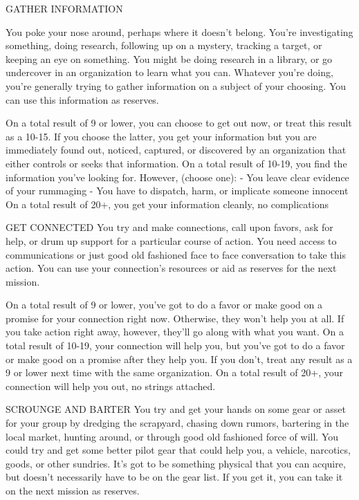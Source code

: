 GATHER INFORMATION  

                                                                                                                   


You poke your nose around, perhaps where it doesn’t belong. You’re investigating something,  
doing research, following up on a mystery, tracking a target, or keeping an eye on something. You  
might be doing research in a library, or go undercover in an organization to learn what you can.  
Whatever you’re doing, you’re generally trying to gather information on a subject of your choosing.  
You can use this information as reserves.  

On a total result of 9 or lower, you can choose to get out now, or treat this result as a 10-15. If you  
choose the latter, you get your information but you are immediately found out, noticed, captured,  
or discovered by an organization that either controls or seeks that information.  
On a total result of 10-19, you find the information you’ve looking for. However, (choose one):  
    -    You leave clear evidence of your rummaging  
    -    You have to dispatch, harm, or implicate someone innocent  
On a total result of 20+, you get your information cleanly, no complications  

GET CONNECTED  
You try and make connections, call upon favors, ask for help, or drum up support for a particular  
course of action. You need access to communications or just good old fashioned face to face  
conversation to take this action. You can use your connection’s resources or aid as reserves for  
the next mission.  

On a total result of 9 or lower, you’ve got to do a favor or make good on a promise for your  
connection right now. Otherwise, they won’t help you at all. If you take action right away, however,  
they’ll go along with what you want.  
On a total result of 10-19, your connection will help you, but you’ve got to do a favor or make good  
on a promise after they help you. If you don’t, treat any result as a 9 or lower next time with the  
same organization.  
On a total result of 20+, your connection will help you out, no strings attached.  

SCROUNGE AND BARTER  
You try and get your hands on some gear or asset for your group by dredging the scrapyard,  
chasing down rumors, bartering in the local market, hunting around, or through good old  
fashioned force of will. You could try and get some better pilot gear that could help you, a vehicle,  
narcotics, goods, or other sundries. It’s got to be something physical that you can acquire, but  
doesn’t necessarily have to be on the gear list. If you get it, you can take it on the next mission as  
reserves.  


